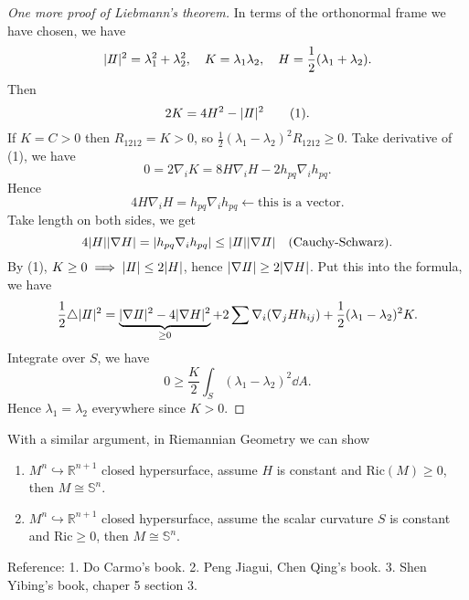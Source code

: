 \begin{proof}[One more proof of Liebmann's theorem]
    In terms of the orthonormal frame we have chosen, we have \[
        |I\!I|^2=\lambda_1^2+\lambda_2^2,\quad K=\lambda_1\lambda_2,\quad
        H=\frac{1}{2}(\lambda_1+\lambda_2)
    .\] Then \[
        2K=4H^2-|I\!I|^2\qquad\text{(1)}
    .\] If \(K=C>0\) then \(R_{1212}=K>0\), so \(\frac{1}{2}(\lambda_1-\lambda_2)^2
    R_{1212}\ge 0\). Take derivative of (1), we have \[
        0=2\nabla_i K=8H\nabla_i H-2h_{pq}\nabla_i h_{pq}
    .\] Hence \[
        4H\nabla_i H=h_{pq}\nabla_i h_{pq}\leftarrow\text{this is a vector}
    .\] Take length on both sides, we get \[
        4|H||\nabla H|=|h_{pq}\nabla_i h_{pq}|\le |I\!I||\nabla I\!I|\quad
        \text{(Cauchy-Schwarz)}
    .\] By (1), \(K\ge 0\implies |I\!I|\le 2|H|\), hence \(|\nabla I\!I|\ge 2|\nabla H|\).
    Put this into the formula, we have \[
        \frac{1}{2}\triangle |I\!I|^2=\underbrace{|\nabla I\!I|^2-4|\nabla H|^2}_{\ge 0}
        +2\sum\nabla_i(\nabla_j H h_{ij})+\frac{1}{2}(\lambda_1-\lambda_2)^2K
    .\] Integrate over \(S\), we have \[
        0\ge \frac{K}{2}\int_{S}(\lambda_1-\lambda_2)^2\dd{A}
    .\] Hence \(\lambda_1=\lambda_2\) everywhere since \(K>0\).
\end{proof}
\begin{remark}
    With a similar argument, in Riemannian Geometry we can show
    \begin{enumerate}[(1)]
    \item \(M^n\hookrightarrow\mathbb{R}^{n+1}\) closed hypersurface, assume \(H\)
        is constant and \(\mathrm{Ric}(M)\ge 0\), then \(M\cong \mathbb{S}^n\).
    \item \(M^n\hookrightarrow\mathbb{R}^{n+1}\) closed hypersurface, assume the
        scalar curvature \(S\) is constant and \(\mathrm{Ric}\ge 0\), then
        \(M\cong \mathbb{S}^n\).
    \end{enumerate}
    Reference: 1. Do Carmo's book. 2. Peng Jiagui, Chen Qing's book.
    3. Shen Yibing's book, chaper 5 section 3.
\end{remark}

